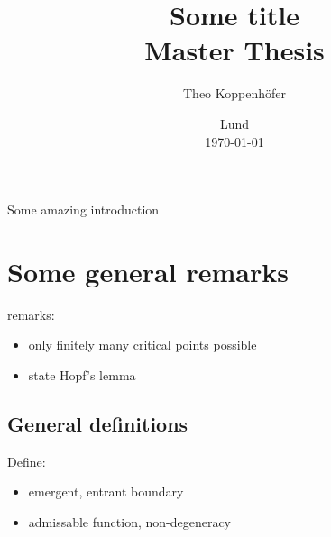 




\title{ Some title \\[1ex]
	  \large Master Thesis}
\author{Theo Koppenhöfer}
\date{Lund \\[1ex] \today}



\usepackage{svg}
\graphicspath{{../Plots/}}
\graphicspath{{../Figures/}}


\newcommand{\bx}{\bar{x}}





\maketitle

Some amazing introduction
 
\newpage

\section*{Some general remarks}

remarks:
\begin{itemize}
  \item only finitely many critical points possible
  \item state Hopf's lemma
\end{itemize}

\subsection*{General definitions}

Define:
\begin{itemize}
  \item emergent, entrant boundary
  \item admissable function, non-degeneracy
\end{itemize}

